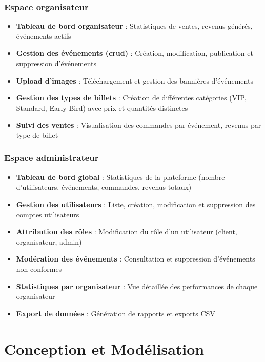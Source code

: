 \documentclass[a4paper,12pt,twoside]{report}
\begin{document}
\subsection{Espace organisateur}

\begin{itemize}
    \item \textbf{Tableau de bord organisateur} : Statistiques de ventes, revenus générés, événements actifs
    \item \textbf{Gestion des événements (\gls{crud})} : Création, modification, publication et suppression d'événements
    \item \textbf{Upload d'images} : Téléchargement et gestion des bannières d'événements
    \item \textbf{Gestion des types de billets} : Création de différentes catégories (VIP, Standard, Early Bird) avec prix et quantités distinctes
    \item \textbf{Suivi des ventes} : Visualisation des commandes par événement, revenus par type de billet
\end{itemize}

\subsection{Espace administrateur}

\begin{itemize}
    \item \textbf{Tableau de bord global} : Statistiques de la plateforme (nombre d'utilisateurs, événements, commandes, revenus totaux)
    \item \textbf{Gestion des utilisateurs} : Liste, création, modification et suppression des comptes utilisateurs
    \item \textbf{Attribution des rôles} : Modification du rôle d'un utilisateur (client, organisateur, admin)
    \item \textbf{Modération des événements} : Consultation et suppression d'événements non conformes
    \item \textbf{Statistiques par organisateur} : Vue détaillée des performances de chaque organisateur
    \item \textbf{Export de données} : Génération de rapports et exports CSV
\end{itemize}

\chapter{Conception et Modélisation}
\thispagestyle{empty}
\end{document}
